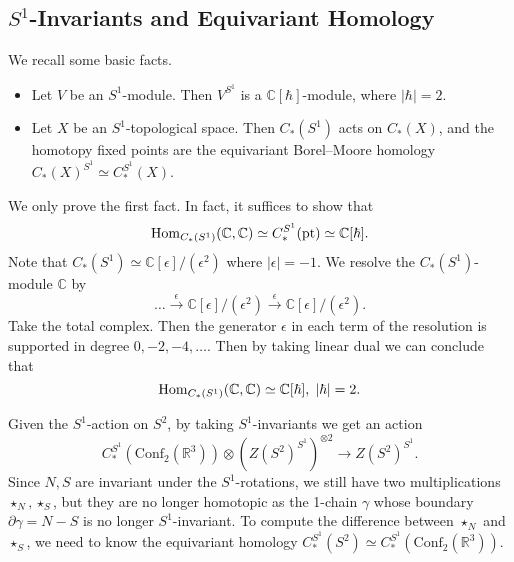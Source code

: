 \subsection{$S^1$-Invariants and Equivariant Homology} We recall some basic facts.
\begin{itemize}
    \item Let $V$ be an $S^1$-module. Then $V^{S^1}$ is a $\mathbb{C}[\hbar]$-module, where $|\hbar| = 2$.
    \item Let $X$ be an $S^1$-topological space. Then $C_*(S^1)$ acts on $C_*(X)$, and the homotopy fixed points are the equivariant Borel--Moore homology $C_*(X)^{S^1} \simeq C_*^{S^1}(X)$.
\end{itemize}
We only prove the first fact. In fact, it suffices to show that
$$\mathrm{Hom}_{C_*(S^1)}(\mathbb{C}, \mathbb{C}) \simeq C_*^{S^1}(\mathrm{pt}) \simeq \mathbb{C}[\hbar].$$
Note that $C_*(S^1) \simeq \mathbb{C}[\epsilon]/(\epsilon^2)$ where $|\epsilon| = -1$. We resolve the $C_*(S^1)$-module $\mathbb{C}$ by
$$\dots \xrightarrow{\epsilon} \mathbb{C}[\epsilon]/(\epsilon^2)  \xrightarrow{\epsilon} \mathbb{C}[\epsilon]/(\epsilon^2).$$
Take the total complex. Then the generator $\epsilon$ in each term of the resolution is supported in degree $0, -2, -4, \dots$. Then by taking linear dual we can conclude that 
$$\mathrm{Hom}_{C_*(S^1)}(\mathbb{C}, \mathbb{C}) \simeq \mathbb{C}[\hbar], \; |\hbar| = 2.$$

Given the $S^1$-action on $S^2$, by taking $S^1$-invariants we get an action
$$C_*^{S^1}(\mathrm{Conf}_2(\mathbb{R}^3)) \otimes (Z(S^2)^{S^1})^{\otimes 2} \rightarrow Z(S^2)^{S^1}.$$
Since $N, S$ are invariant under the $S^1$-rotations, we still have two multiplications $\star_N, \star_S$, but they are no longer homotopic as the 1-chain $\gamma$ whose boundary $\partial \gamma = N - S$ is no longer $S^1$-invariant. To compute the difference between $\star_N$ and $\star_S$, we need to know the equivariant homology $C_*^{S^1}(S^2) \simeq C_*^{S^1}(\mathrm{Conf}_2(\mathbb{R}^3))$.

